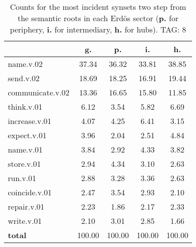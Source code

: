 \begin{table}[h!]
\begin{center}
\begin{tabular}{| l | c | c | c | c |}\hline
 & g. & p. & i. & h. \\\hline
name.v.02 & 37.34  & 36.32  & 33.81  & 38.85 \\\hline
send.v.02 & 18.69  & 18.25  & 16.91  & 19.44 \\\hline
communicate.v.02 & 13.36  & 16.65  & 15.80  & 11.85 \\\hline
think.v.01 & 6.12  & 3.54  & 5.82  & 6.69 \\\hline
increase.v.01 & 4.07  & 4.25  & 6.41  & 3.15 \\\hline
expect.v.01 & 3.96  & 2.04  & 2.51  & 4.84 \\\hline
name.v.01 & 3.84  & 2.92  & 4.33  & 3.82 \\\hline
store.v.01 & 2.94  & 4.34  & 3.10  & 2.63 \\\hline
run.v.01 & 2.88  & 3.28  & 3.36  & 2.63 \\\hline
coincide.v.01 & 2.47  & 3.54  & 2.93  & 2.10 \\\hline
repair.v.01 & 2.23  & 1.86  & 2.17  & 2.33 \\\hline
write.v.01 & 2.10  & 3.01  & 2.85  & 1.66 \\\hline
{{\bf total}} & 100.00  & 100.00  & 100.00  & 100.00 \\\hline
\end{tabular}
\caption{Counts for the most incident synsets two step from the semantic roots in each Erd\"os sector ({\bf p.} for periphery, {\bf i.} for intermediary, {\bf h.} for hubs). TAG: 8}
\end{center}
\end{table}